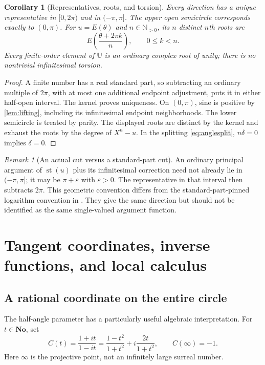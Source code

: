 \documentclass[11pt,letterpaper]{article}
\newtheorem{corollary}[theorem]{Corollary}
\theoremstyle{definition}
\theoremstyle{remark}
\newtheorem{remark}[theorem]{Remark}
\newcommand{\No}{\mathbf{No}}
\newcommand{\N}{\mathbb N}\newcommand{\Z}{\mathbb Z}
\newcommand{\U}{\mathbb U}\newcommand{\PP}{\mathbb P}
\newcommand{\st}{\operatorname{st}}
\numberwithin{equation}{section}
\begin{document}
\begin{corollary}[Representatives, roots, and torsion]\label{cor:representatives}
Every direction has a unique representative in $[0,2\pi)$ and in $(-\pi,\pi]$. The upper open semicircle corresponds exactly to $(0,\pi)$. For $u=E(\theta)$ and $n\in\N_{>0}$, its $n$ distinct $n$th roots are
\[
 E\left(\frac{\theta+2\pi k}{n}\right),\qquad 0\le k<n.
\]
Every finite-order element of $\U$ is an ordinary complex root of unity; there is no nontrivial infinitesimal torsion.
\end{corollary}
\begin{proof}
A finite number has a real standard part, so subtracting an ordinary multiple of $2\pi$, with at most one additional endpoint adjustment, puts it in either half-open interval. The kernel proves uniqueness. On $(0,\pi)$, sine is positive by \cref{lem:lifting}, including its infinitesimal endpoint neighborhoods. The lower semicircle is treated by parity. The displayed roots are distinct by the kernel and exhaust the roots by the degree of $X^n-u$. In the splitting \eqref{eq:anglesplit}, $n\delta=0$ implies $\delta=0$.
\end{proof}

\begin{remark}[An actual cut versus a standard-part cut]\label{rem:cut}
An ordinary principal argument of $\st(u)$ plus its infinitesimal correction need not already lie in $(-\pi,\pi]$; it may be $\pi+\varepsilon$ with $\varepsilon>0$. The representative in that interval then subtracts $2\pi$. This geometric convention differs from the standard-part-pinned logarithm convention in \cite{SourceAnalysis}. They give the same direction but should not be identified as the same single-valued argument function.
\end{remark}

\section{Tangent coordinates, inverse functions, and local calculus}\label{sec:inverse}
\subsection{A rational coordinate on the entire circle}
The half-angle parameter has a particularly useful algebraic interpretation. For $t\in\No$, set
\begin{equation}\label{eq:cayley}
 C(t)=\frac{1+it}{1-it}
 =\frac{1-t^2}{1+t^2}+i\frac{2t}{1+t^2},
 \qquad C(\infty)=-1.
\end{equation}
Here $\infty$ is the projective point, not an infinitely large surreal number.
\end{document}
